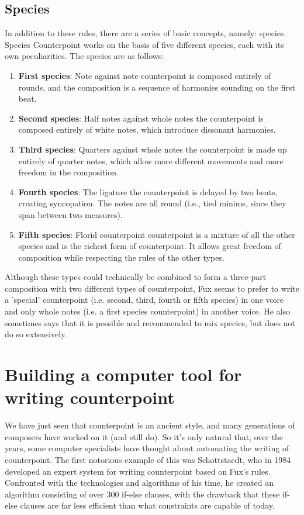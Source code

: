 \subsection{Species}
In addition to these rules, there are a series of basic concepts, namely: species. Species Counterpoint works on the basis of five different species, each with its own peculiarities. The species are as follows:
\begin{enumerate}
    \item \textbf{First species}: Note against note \textendash{} counterpoint is composed entirely of rounds, and the composition is a sequence of harmonies sounding on the first beat.
    \item \textbf{Second species}: Half notes against whole notes \textendash{} the counterpoint is composed entirely of white notes, which introduce dissonant harmonies.
    \item \textbf{Third species}: Quarters against whole notes \textendash{} the counterpoint is made up entirely of quarter notes, which allow more different movements and more freedom in the composition.
    \item \textbf{Fourth species}: The ligature \textendash{} the counterpoint is delayed by two beats, creating syncopation. The notes are all round (i.e., tied minims, since they span between two measures).
    \item \textbf{Fifth species}: Florid counterpoint \textendash{} counterpoint is a mixture of all the other species and is the richest form of counterpoint. It allows great freedom of composition while respecting the rules of the other types.
\end{enumerate}

Although these types could technically be combined to form a three-part composition with two different types of counterpoint, Fux seems to prefer to write a 'special' counterpoint (i.e. second, third, fourth or fifth species) in one voice and only whole notes (i.e. a first species counterpoint) in another voice. He also sometimes says that it is possible and recommended to mix species, but does not do so extensively.

\section{Building a computer tool for writing counterpoint}
We have just seen that counterpoint is an ancient style, and many generations of composers have worked on it (and still do). So it's only natural that, over the years, some computer specialists have thought about automating the writing of counterpoint. The first notorious example of this was Schottstaedt, who in 1984 developed an expert system for writing counterpoint based on Fux's rules. Confronted with the technologies and algorithms of his time, he created an algorithm consisting of over 300 if-else clauses, with the drawback that these if-else clauses are far less efficient than what constraints are capable of today.

